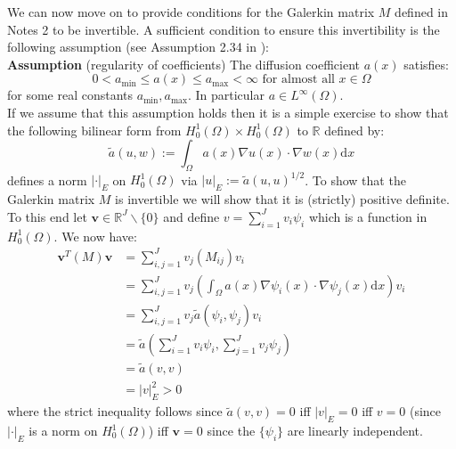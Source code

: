 We can now move on to provide conditions for the Galerkin matrix $M$ defined in Notes 2 to be invertible. A sufficient condition to ensure this invertibility is the following assumption (see Assumption 2.34 in \cite{lord2014introduction}): \\

\noindent \textbf{Assumption} (regularity of coefficients) The diffusion coefficient $a(x)$ satisfies:
\begin{equation}
    \label{regularity_of_coeff}
    0<a_{\text{min}}\leq a(x) \leq a_{\text{max}}<\infty \text{ for almost all } x\in\Omega
\end{equation}
for some real constants $a_{\text{min}},a_{\text{max}}$. In particular $a\in L^{\infty}(\Omega)$. \\

If we assume that this assumption holds then it is a simple exercise to show that the following bilinear form from $H_{0}^{1}(\Omega)\times H_{0}^{1}(\Omega)$ to $\mathbb{R}$ defined by:
\begin{equation}
    \label{bilinear_form}
    \tilde{a}(u,w):=\int_{\Omega}a(x)\nabla u(x)\cdot\nabla w(x)\mathrm{d}x
\end{equation}
defines a norm $|\cdot|_{E}$ on $H_{0}^{1}(\Omega)$ via $|u|_{E}:=\tilde{a}(u,u)^{1/2}$. To show that the Galerkin matrix $M$ is invertible we will show that it is (strictly) positive definite. To this end let $\mathbf{v}\in\mathbb{R}^{J}\backslash\{0\}$ and define $v=\sum_{i=1}^{J}v_{i}\psi_{i}$ which is a function in $H_{0}^{1}(\Omega)$. We now have:
\begin{align*}
    \mathbf{v}^{T}(M)\mathbf{v}&=\sum_{i,j=1}^{J}v_{j}(M_{ij})v_{i} \\
    &=\sum_{i,j=1}^{J}v_{j}\left(\int_{\Omega}a(x)\nabla\psi_{i}(x)\cdot\nabla\psi_{j}(x)\mathrm{d}x\right)v_{i} \\
    &=\sum_{i,j=1}^{J}v_{j}\tilde{a}(\psi_{i},\psi_{j})v_{i}\\
    &=\tilde{a}\left(\sum_{i=1}^{J}v_{i}\psi_{i},\sum_{j=1}^{J}v_{j}\psi_{j}\right) \\
    &=\tilde{a}(v,v) \\
    &=|v|_{E}^{2}>0
\end{align*}
where the strict inequality follows since $\tilde{a}(v,v)=0$ iff $|v|_{E}=0$ iff $v=0$ (since $|\cdot|_{E}$ is a norm on $H_{0}^{1}(\Omega)$) iff $\mathbf{v}=0$ since the $\{\psi_{i}\}$ are linearly independent.
